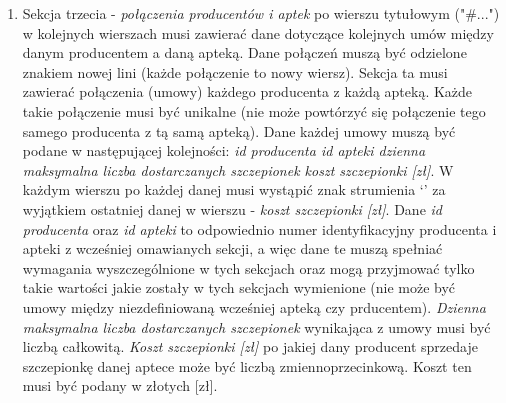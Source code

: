\documentclass[11pt]{article}
\begin{document}
\begin{enumerate}
    \item Sekcja trzecia - \emph{połączenia producentów i aptek} po wierszu tytułowym ("\#...") w kolejnych wierszach musi zawierać dane dotyczące kolejnych umów między danym producentem a daną apteką. Dane połączeń muszą być odzielone znakiem nowej lini (każde połączenie to nowy wiersz). Sekcja ta musi zawierać połączenia (umowy) każdego producenta z każdą apteką. Każde takie połączenie musi być unikalne (nie może powtórzyć się połączenie tego samego producenta z tą samą apteką). Dane każdej umowy muszą być podane w następującej kolejności: \emph{id producenta \textbar\space id apteki \textbar\space dzienna maksymalna liczba dostarczanych szczepionek \textbar\space koszt szczepionki [zł]}. W każdym wierszu po każdej danej musi wystąpić znak strumienia ‘\textbar’ za wyjątkiem ostatniej danej w wierszu - \emph{koszt szczepionki [zł]}.  Dane \emph{id producenta} oraz \emph{id apteki} to odpowiednio numer identyfikacyjny producenta i apteki z wcześniej omawianych sekcji, a więc dane te muszą spełniać wymagania wyszczególnione w tych sekcjach oraz mogą przyjmować tylko takie wartości jakie zostały w tych sekcjach wymienione (nie może być umowy między niezdefiniowaną wcześniej apteką czy prducentem). \emph{Dzienna maksymalna liczba dostarczanych szczepionek} wynikająca z umowy musi być liczbą całkowitą. \emph{Koszt szczepionki [zł]} po jakiej dany producent sprzedaje szczepionkę danej aptece może być liczbą zmiennoprzecinkową. Koszt ten musi być podany w złotych [zł].
\end{enumerate}
\end{document}
